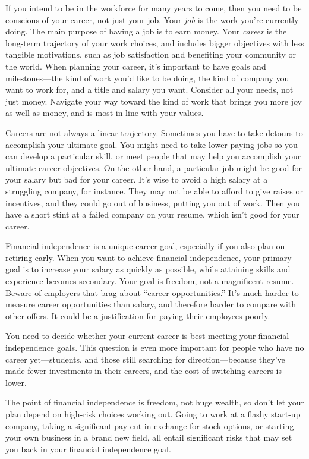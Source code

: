 If you intend to be in the workforce for many years to come, then you need to be conscious of your career, not just your job. Your \emph{job} is the work you're currently doing. The main purpose of having a job is to earn money. Your \emph{career} is the long-term trajectory of your work choices, and includes bigger objectives with less tangible motivations, such as job satisfaction and benefiting your community or the world. When planning your career, it's important to have goals and milestones---the kind of work you'd like to be doing, the kind of company you want to work for, and a title and salary you want. Consider all your needs, not just money. Navigate your way toward the kind of work that brings you more joy as well as money, and is most in line with your values.

Careers are not always a linear trajectory. Sometimes you have to take detours to accomplish your ultimate goal. You might need to take lower-paying jobs so you can develop a particular skill, or meet people that may help you accomplish your ultimate career objectives. On the other hand, a particular job might be good for your salary but bad for your career. It's wise to avoid a high salary at a struggling company, for instance. They may not be able to afford to give raises or incentives, and they could go out of business, putting you out of work. Then you have a short stint at a failed company on your resume, which isn't good for your career.

Financial independence is a unique career goal, especially if you also plan on retiring early. When you want to achieve financial independence, your primary goal is to increase your salary as quickly as possible, while attaining skills and experience becomes secondary. Your goal is freedom, not a magnificent resume. Beware of employers that brag about ``career opportunities.'' It's much harder to measure career opportunities than salary, and therefore harder to compare with other offers. It could be a justification for paying their employees poorly.

You need to decide whether your current career is best meeting your financial independence goals. This question is even more important for people who have no career yet---students, and those still searching for direction---because they've made fewer investments in their careers, and the cost of switching careers is lower.

The point of financial independence is freedom, not huge wealth, so don't let your plan depend on high-risk choices working out. Going to work at a flashy start-up company, taking a significant pay cut in exchange for stock options, or starting your own business in a brand new field, all entail significant risks that may set you back in your financial independence goal.


